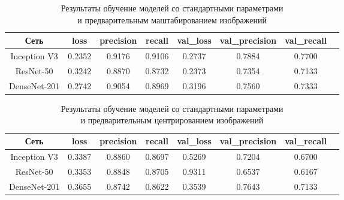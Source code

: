 \begin{table}[H]
    \centering
    \caption{Результаты обучение моделей со стандартными параметрами \\и предварительным маштабированием изображений} \label{rescale}
    \begin{tabular}{|c|c|c|c|c|c|c|c|}
        \hline    
        Сеть          & loss   & precision & recall & val\_loss & val\_precision & val\_recall \\ %
        \hline
        Inception V3  & 0.2352 & 0.9176    & 0.9106 & 0.2737   & 0.7884        & 0.7700 \\ %
        \hline
        ResNet-50     & 0.3242 & 0.8870    & 0.8732 & 0.2373    & 0.7354         & 0.7133 \\ %
        \hline
        DenseNet-201  & 0.2742 & 0.9054    & 0.8969 & 0.3196    & 0.7560         & 0.7333 \\ %
        \hline
      \end{tabular}
\end{table}

\begin{table}[H]
    \centering
    \caption{Результаты обучение моделей со стандартными параметрами \\и предварительным центрированием изображений} \label{samplewise}    
    \begin{tabular}{|c|c|c|c|c|c|c|c|}
        \hline    
        Сеть          & loss   & precision & recall & val\_loss & val\_precision & val\_recall \\ %
        \hline
        Inception V3  & 0.3387 & 0.8860    & 0.8697 & 0.5269    & 0.7204         & 0.6700 \\ %
        \hline
        ResNet-50     & 0.3353  & 0.8848   & 0.8705 & 0.9311   & 0.6537        & 0.6167 \\ %
        \hline
        DenseNet-201  & 0.3655  & 0.8742   & 0.8622 & 0.3539   & 0.7643        & 0.7133 \\ %
        \hline
      \end{tabular}
\end{table}




